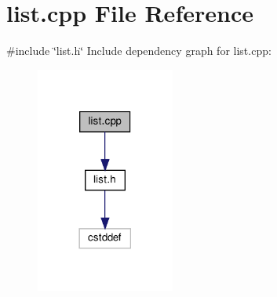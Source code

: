 \section{list.\+cpp File Reference}
\label{list_8cpp}
{\ttfamily \#include \char`\"{}list.\+h\char`\"{}}\newline
Include dependency graph for list.\+cpp\+:
\nopagebreak
\begin{figure}[H]
\begin{center}
\leavevmode
\includegraphics[width=129pt]{list_8cpp__incl}
\end{center}
\end{figure}

